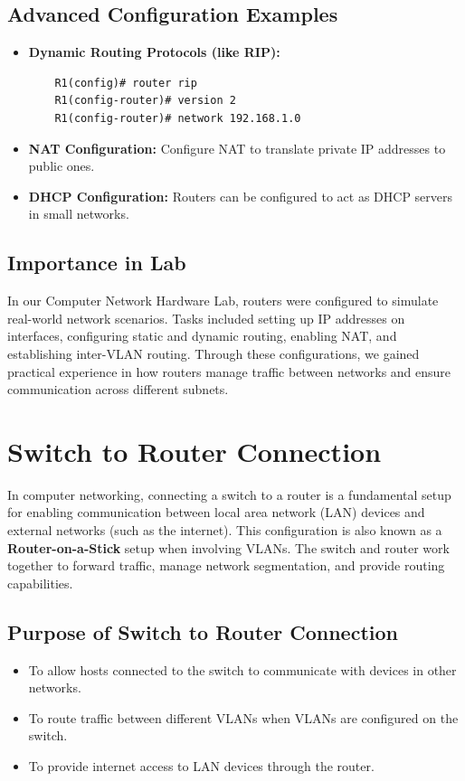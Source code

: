 \documentclass[12pt]{article}
\begin{document}
\subsection{Advanced Configuration Examples}
\begin{itemize}
    \item \textbf{Dynamic Routing Protocols (like RIP):}
    \begin{verbatim}
    R1(config)# router rip
    R1(config-router)# version 2
    R1(config-router)# network 192.168.1.0
    \end{verbatim}
    
    \item \textbf{NAT Configuration:}
    Configure NAT to translate private IP addresses to public ones.
    \item \textbf{DHCP Configuration:}
    Routers can be configured to act as DHCP servers in small networks.
\end{itemize}

\subsection{Importance in Lab}
In our Computer Network Hardware Lab, routers were configured to simulate real-world network scenarios. Tasks included setting up IP addresses on interfaces, configuring static and dynamic routing, enabling NAT, and establishing inter-VLAN routing. Through these configurations, we gained practical experience in how routers manage traffic between networks and ensure communication across different subnets.

\newpage

\section{Switch to Router Connection}

In computer networking, connecting a switch to a router is a fundamental setup for enabling communication between local area network (LAN) devices and external networks (such as the internet). This configuration is also known as a \textbf{Router-on-a-Stick} setup when involving VLANs. The switch and router work together to forward traffic, manage network segmentation, and provide routing capabilities.

\subsection{Purpose of Switch to Router Connection}
\begin{itemize}
    \item To allow hosts connected to the switch to communicate with devices in other networks.
    \item To route traffic between different VLANs when VLANs are configured on the switch.
    \item To provide internet access to LAN devices through the router.
\end{itemize}
\end{document}
